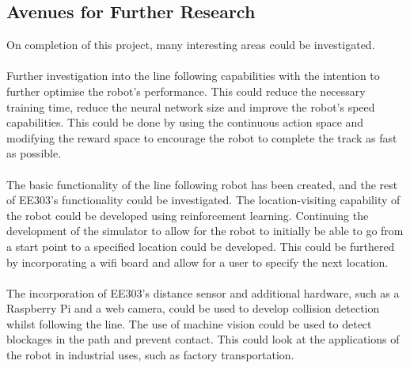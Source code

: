 \documentclass[a4paper,12pt]{article}
\begin{document}
\subsection{Avenues for Further Research}
On completion of this project, many interesting areas could be investigated. 
\\\\
Further investigation into the line following capabilities with the intention to further optimise the robot's performance. This could reduce the necessary training time, reduce the neural network size and improve the robot's speed capabilities. This could be done by using the continuous action space and modifying the reward space to encourage the robot to complete the track as fast as possible.  
\\\\
The basic functionality of the line following robot has been created, and the rest of EE303's functionality could be investigated. The location-visiting capability of the robot could be developed using reinforcement learning. Continuing the development of the simulator to allow for the robot to initially be able to go from a start point to a specified location could be developed. This could be furthered by incorporating a wifi board and allow for a user to specify the next location. 
\\\\
The incorporation of EE303's distance sensor and additional hardware, such as a Raspberry Pi and a web camera, could be used to develop collision detection whilst following the line. The use of machine vision could be used to detect blockages in the path and prevent contact. This could look at the applications of the robot in industrial uses, such as factory transportation.


\pagebreak
\end{document}
